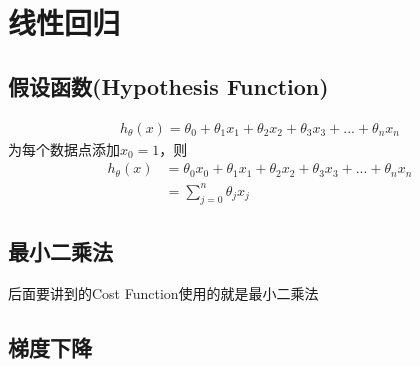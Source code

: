 \section{线性回归}
\subsection{假设函数(Hypothesis Function)}
\begin{equation}\begin{aligned}
	h_\theta(x) = \theta_0 + \theta_1x_1 + \theta_2x_2 + \theta_3x_3 + ... + \theta_nx_n
\end{aligned}\end{equation}
为每个数据点添加$x_0=1$，则
\begin{equation}\begin{aligned}
	h_\theta(x) &= \theta_0x_0 + \theta_1x_1 + \theta_2x_2 + \theta_3x_3 + ... + \theta_nx_n \\
	&= \sum_{j=0}^n{\theta_jx_j}
\end{aligned}\end{equation}

\subsection{最小二乘法}
后面要讲到的Cost Function使用的就是最小二乘法

\subsection{梯度下降}
